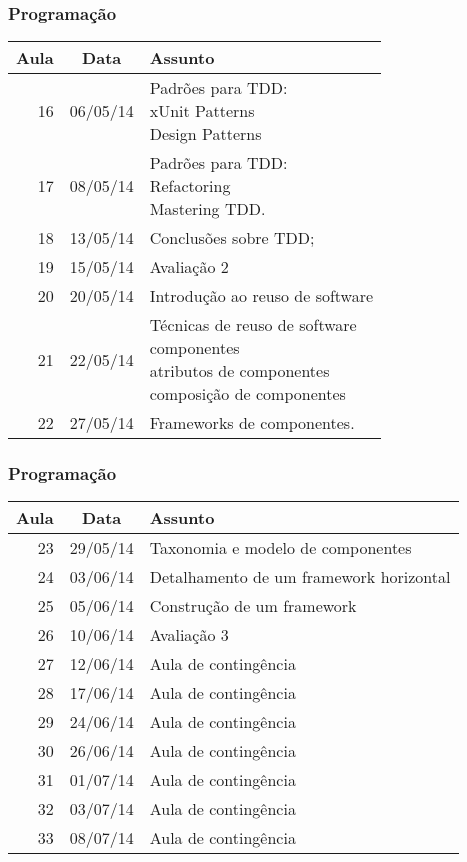 \documentclass{beamer}
\begin{document}
	\begin{frame}
	\frametitle{Programação}
	
\begin{table}[htbp]
\begin{tabular}{|r|r|l|}
\hline
\multicolumn{1}{|c|}{Aula} & \multicolumn{1}{c|}{Data} & Assunto \\ \hline
16 & 06/05/14 & \shortstack[l]{Padrões para TDD:\\xUnit Patterns\\Design Patterns}\\ \hline
17 & 08/05/14 & \shortstack[l]{Padrões para TDD:\\Refactoring\\Mastering TDD.} \\ \hline
18 & 13/05/14 & Conclusões sobre TDD; \\ \hline
19 & 15/05/14 & Avaliação 2 \\ \hline
20 & 20/05/14 & Introdução ao reuso de software \\ \hline
21 & 22/05/14 & \shortstack[l]{Técnicas de reuso de software\\componentes\\atributos de componentes\\composição de componentes} \\ \hline
22 & 27/05/14 & Frameworks de componentes. \\ \hline

\end{tabular}
\label{}
\end{table}	
	\end{frame}
	\begin{frame}
	\frametitle{Programação}
	
\begin{table}[htbp]
\begin{tabular}{|r|r|l|}
\hline
\multicolumn{1}{|c|}{Aula} & \multicolumn{1}{c|}{Data} & Assunto \\ \hline
23 & 29/05/14 & Taxonomia e modelo de componentes \\ \hline
24 & 03/06/14 & Detalhamento de um framework horizontal \\ \hline
25 & 05/06/14 & Construção de um framework \\ \hline
26 & 10/06/14 & Avaliação 3 \\ \hline
27 & 12/06/14 & Aula de contingência \\ \hline
28 & 17/06/14 & Aula de contingência \\ \hline
29 & 24/06/14 & Aula de contingência \\ \hline
30 & 26/06/14 & Aula de contingência \\ \hline
31 & 01/07/14 & Aula de contingência \\ \hline
32 & 03/07/14 & Aula de contingência \\ \hline
33 & 08/07/14 & Aula de contingência \\ \hline
\end{tabular}
\label{}
\end{table}	
	
	

\end{frame}
	
\end{document}

